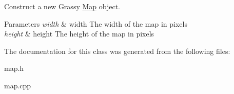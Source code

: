 Construct a new Grassy \mbox{\hyperlink{classMap}{Map}} object. 


\begin{DoxyParams}{Parameters}
{\em width} & width The width of the map in pixels \\
\hline
{\em height} & height The height of the map in pixels \\
\hline
\end{DoxyParams}


The documentation for this class was generated from the following files\+:\begin{DoxyCompactItemize}
\item 
map.\+h\item 
map.\+cpp\end{DoxyCompactItemize}
